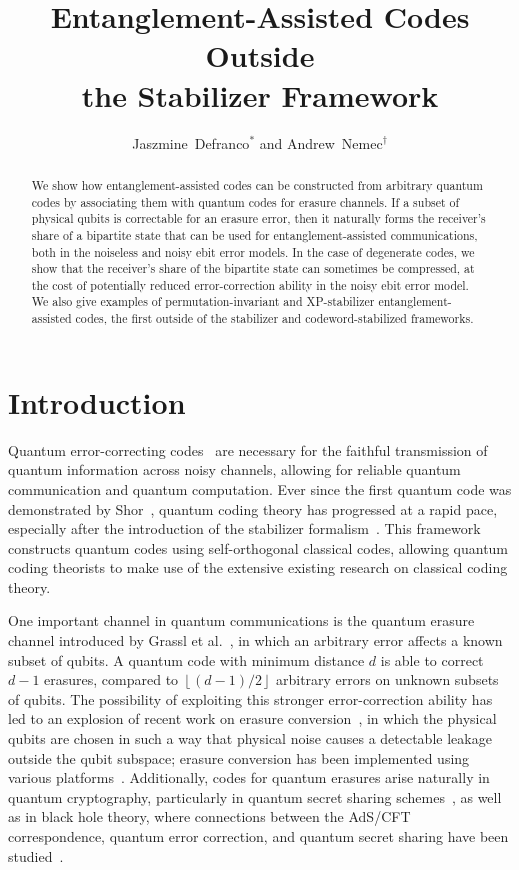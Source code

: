 \documentclass[]{amsart}
\title[EA Codes Outside the Stabilizer Framework]{Entanglement-Assisted Codes Outside\\the Stabilizer Framework}
\author[J.~Defranco and A.~Nemec]{Jaszmine~Defranco$^*$ and Andrew~Nemec$^\dagger$}
\begin{document}
\begin{abstract}
    We show how entanglement-assisted codes can be constructed from arbitrary quantum codes by associating them with quantum codes for erasure channels.
    If a subset of physical qubits is correctable for an erasure error, then it naturally forms the receiver's share of a bipartite state that can be used for entanglement-assisted communications, both in the noiseless and noisy ebit error models.
    In the case of degenerate codes, we show that the receiver's share of the bipartite state can sometimes be compressed, at the cost of potentially reduced error-correction ability in the noisy ebit error model.
    We also give examples of permutation-invariant and XP-stabilizer entanglement-assisted codes, the first outside of the stabilizer and codeword-stabilized frameworks.
\end{abstract}

\maketitle

\section{Introduction}

Quantum error-correcting codes~\cite{Sho1995,Ste1996,CS1996,Got1997,CRSS1998} are necessary for the faithful transmission of quantum information across noisy channels, allowing for reliable quantum communication and quantum computation.
Ever since the first quantum code was demonstrated by Shor~\cite{Sho1995}, quantum coding theory has progressed at a rapid pace, especially after the introduction of the stabilizer formalism~\cite{Got1997,CRSS1998}.
This framework constructs quantum codes using self-orthogonal classical codes, allowing quantum coding theorists to make use of the extensive existing research on classical coding theory.

One important channel in quantum communications is the quantum erasure channel introduced by Grassl et al.~\cite{GBP1997}, in which an arbitrary error affects a known subset of qubits.
A quantum code with minimum distance $d$ is able to correct $d-1$ erasures, compared to $\left\lfloor\left(d-1\right)/2\right\rfloor$ arbitrary errors on unknown subsets of qubits.
The possibility of exploiting this stronger error-correction ability has led to an explosion of recent work on erasure conversion~\cite{WKPT22,KHVLBR2023,KCB23}, in which the physical qubits are chosen in such a way that physical noise causes a detectable leakage outside the qubit subspace; erasure conversion has been implemented using various platforms~\cite{SSTFCE2023,MLPZJCBPPT2023,LHHA+2024,GVRK2025}.
Additionally, codes for quantum erasures arise naturally in quantum cryptography, particularly in quantum secret sharing schemes~\cite{CGL1999,Got2000}, as well as in black hole theory, where connections between the AdS/CFT correspondence, quantum error correction, and quantum secret sharing have been studied~\cite{ADH2015,Har2017,HP2019,AR2019,AP2022}.
\end{document}
